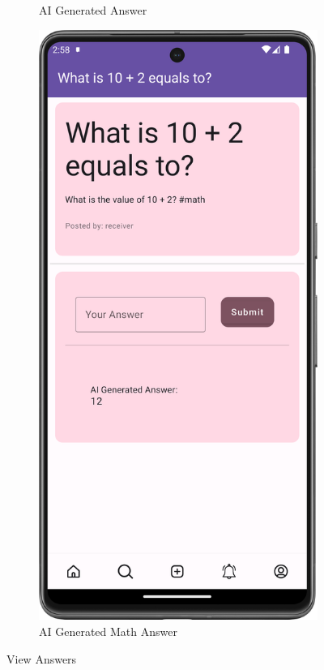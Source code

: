 \begin{figure}[H]
\begin{subfigure}[b]{0.3\textwidth}
    \caption{AI Generated Answer}
    \label{fig:ai_answer}
  \end{subfigure}
  \hfill
  \begin{subfigure}[b]{0.3\textwidth}
    \includegraphics[width=\textwidth]{Figures/Product_Images/Questions_Answers/math_ai_answer.png}
    \caption{AI Generated Math Answer}
    \label{fig:math_ai_answer}
  \end{subfigure}
  \caption{View Answers}
  \label{fig:view_answers}
\end{figure}




